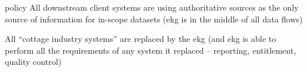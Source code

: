 \kgmmscoringlevelFour

\begin{scoring}

    \item [policy] All downstream client systems are using authoritative sources as the only source of information
          for in-scope datasets (\gls{ekg} is in the middle of all data flows)
    \item All “cottage industry systems” are replaced by the \gls{ekg}
          (and \gls{ekg} is able to perform all the requirements of any system it replaced --
         reporting, entitlement, quality control)

\end{scoring}